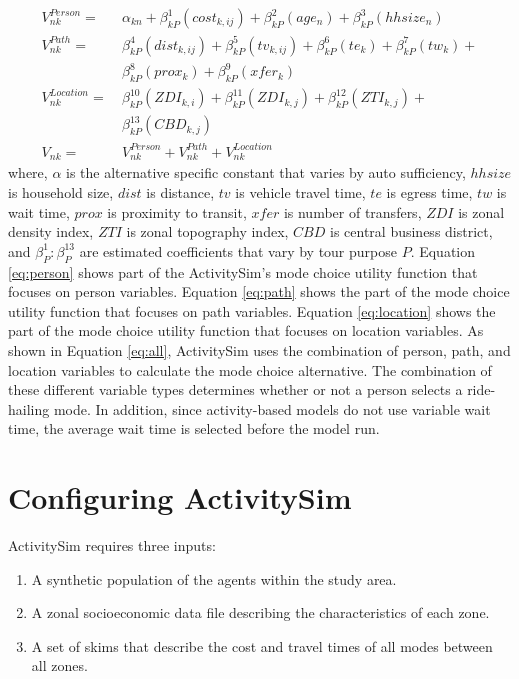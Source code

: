\documentclass[fancy, masters]{byuthesis}
\providecommand{\tightlist}{%
  \setlength{\itemsep}{0pt}\setlength{\parskip}{0pt}}
\begin{document}
\begin{align}
  V_{nk}^{Person} =& \ \alpha_{kn} + \beta_{kP}^1(cost_{k,ij}) + \beta_{kP}^2(age_{n}) 
   + \beta_{kP}^3(hhsize_{n}) \label{eq:person} \\
  V_{nk}^{Path} =& \ \beta_{kP}^4(dist_{k,ij}) +  \beta_{kP}^5(tv_{k,ij}) + 
       \beta_{kP}^6(te_{k}) +  \beta_{kP}^7(tw_{k}) + \nonumber \\ 
      & \ \beta_{kP}^8(prox_{k}) + \beta_{kP}^9(xfer_{k})  \label{eq:path} \\
  V_{nk}^{Location} =&  \ \beta_{kP}^{10}(ZDI_{k,i}) + \beta_{kP}^{11}(ZDI_{k,j}) + 
      \beta_{kP}^{12}(ZTI_{k,j}) + \nonumber \\ 
      & \ \beta_{kP}^{13}(CBD_{k,j}) \label{eq:location}\\
  V_{nk} =& \ V_{nk}^{Person} + V_{nk}^{Path} + V_{nk}^{Location} \label{eq:all}
\end{align}
where, \(\alpha\) is the alternative specific constant that varies by auto sufficiency, \(hhsize\) is household size, \(dist\) is distance, \(tv\) is vehicle travel time, \(te\) is egress time, \(tw\) is wait time, \(prox\) is proximity to transit, \(xfer\) is number of transfers, \(ZDI\) is zonal density index, \(ZTI\) is zonal topography index, \(CBD\) is central business district, and \(\beta_{P}^1:\beta_{P}^{13}\) are estimated coefficients that vary by tour purpose \(P\). Equation \eqref{eq:person} shows part of the ActivitySim's mode choice utility function that focuses on person variables. Equation \eqref{eq:path} shows the part of the mode choice utility function that focuses on path variables. Equation \eqref{eq:location} shows the part of the mode choice utility function that focuses on location variables. As shown in Equation \eqref{eq:all}, ActivitySim uses the combination of person, path, and location variables to calculate the mode choice alternative. The combination of these different variable types determines whether or not a person selects a ride-hailing mode. In addition, since activity-based models do not use variable wait time, the average wait time is selected before the model run.

\hypertarget{configuring-activitysim}{%
\section{Configuring ActivitySim}\label{configuring-activitysim}}

ActivitySim requires three inputs:

\begin{enumerate}
\def\labelenumi{\arabic{enumi}.}
\tightlist
\item
  A synthetic population of the agents within the study area.
\item
  A zonal socioeconomic data file describing the characteristics of each zone.
\item
  A set of skims that describe the cost and travel times of all modes between all zones.
\end{enumerate}
\end{document}
